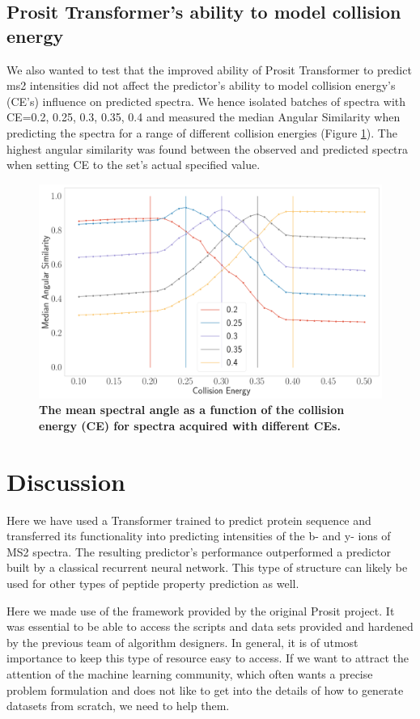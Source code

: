 \documentclass[10pt,a4paper]{article}
\begin{document}
\subsection*{Prosit Transformer’s ability to model collision energy}

We also wanted to test that the improved ability of Prosit Transformer to predict ms2 intensities did not affect the predictor’s ability to model collision energy’s (CE’s) influence on predicted spectra. We hence isolated batches of spectra with CE={0.2, 0.25, 0.3, 0.35, 0.4} and measured the median Angular Similarity when predicting the spectra for a range of different collision energies (Figure \ref{fig:ce}). The highest angular similarity was found between the observed and predicted spectra when setting CE to the set’s actual specified value.



\begin{figure}
\centering
\includegraphics[width=12cm]{./img/ce_calibration.png}
\caption{{\bf The mean spectral angle as a function of the collision energy (CE) for spectra acquired with different CEs.}\label{fig:ce}} 
\end{figure}
 
\section*{Discussion}
Here we have used a Transformer trained to predict protein sequence and transferred its functionality into predicting intensities of the b- and y- ions of MS2 spectra. The resulting predictor’s performance outperformed a predictor built by a classical recurrent neural network. This type of structure can likely be used for other types of peptide property prediction as well.

Here we made use of the framework provided by the original Prosit project. It was essential to be able to access the scripts and data sets provided and hardened by the previous team of algorithm designers. In general, it is of utmost importance to keep this type of resource easy to access. If we want to attract the attention of the machine learning community, which often wants a precise problem formulation and does not like to get into the details of how to generate datasets from scratch, we need to help them.
\end{document}
